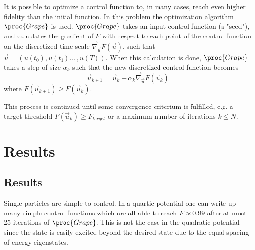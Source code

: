 \documentclass[aps,pra,reprint,superscriptaddress]{revtex4-1}
\begin{document}
It is possible to optimize a control function to, in many cases, reach even higher fidelity than the initial function. In this problem the optimization algorithm $\proc{Grape}$ is used. $\proc{Grape}$ takes an input control function (a "seed"), and calculates the gradient of $F$ with respect to each point of the control function on the discretized time scale $\vec{\nabla}_{\vec{u}}F(\vec{u})$, such that $\vec{u} = (u(t_0), u(t_1) ... \,, u(T))$. When this calculation is done, $\proc{Grape}$ takes a step of size $\alpha_k$ such that the new discretized control function becomes
\begin{equation}
	\vec{u}_{k+1} = \vec{u}_{k} + \alpha_k \vec{\nabla}_{\vec{u}}F(\vec{u}_k)
\end{equation}
where $F(\vec{u}_{k+1}) \geq F(\vec{u}_{k})$.

This process is continued until some convergence criterium is fulfilled, e.g. a target threshold $F(\vec{u}_{k}) \geq F_{target}$ or a maximum number of iterations $k \leq N$.


\section{\label{sec:results}Results}


\subsection{\label{subsec:obs}Results}
Single particles are simple to control. In a quartic potential one can write up many simple control functions which are all able to reach $F\approx0.99$ after at most 25 iterations of $\proc{Grape}$. This is not the case in the quadratic potential since the state is easily excited beyond the desired state due to the equal spacing of energy eigenstates. \\
\end{document}
